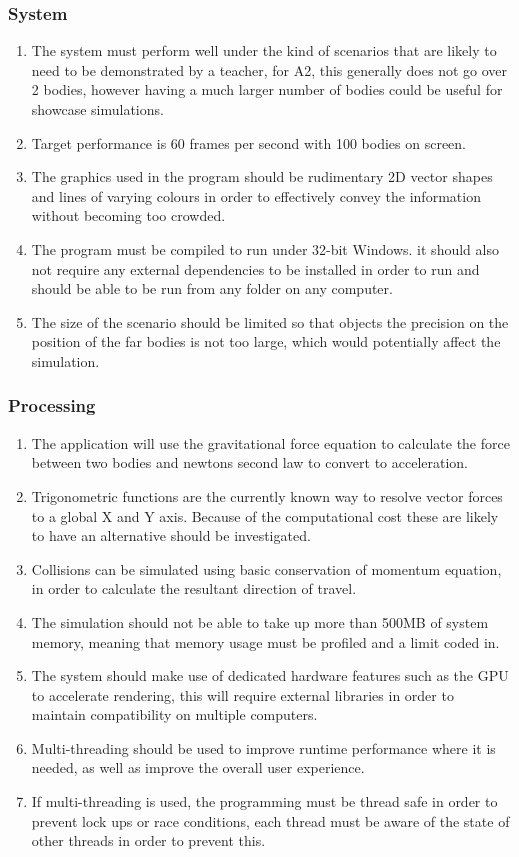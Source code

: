 \subsubsection{System}
\begin{enumerate}
\item The system must perform well under the kind of scenarios that are likely to need to be demonstrated by a teacher, for A2, this generally does not go over 2 bodies, however having a much larger number of bodies could be useful for showcase simulations.
\item Target performance is 60 frames per second with 100 bodies on screen.
\item The graphics used in the program should be rudimentary 2D vector shapes and lines of varying colours in order to effectively convey the information without becoming too crowded.
\item The program must be compiled to run under 32-bit Windows. it should also not require any external dependencies to be installed in order to run and should be able to be run from any folder on any computer.
\item The size of the scenario should be limited so that objects the precision on the position of the far bodies is not too large, which would potentially affect the simulation.
\end{enumerate}

\subsubsection{Processing}
\begin{enumerate}
\item The application will use the gravitational force equation to calculate the force between two bodies and newtons second law to convert to acceleration.
\item Trigonometric functions are the currently known way to resolve vector forces to a global X and Y axis. Because of the computational cost these are likely to have an alternative should be investigated.
\item Collisions can be simulated using basic conservation of momentum equation, in order to calculate the resultant direction of travel.
\item The simulation should not be able to take up more than 500MB of system memory, meaning that memory usage must be profiled and a limit coded in.
\item The system should make use of dedicated hardware features such as the GPU to accelerate rendering, this will require external libraries in order to maintain compatibility on multiple computers.
\item Multi-threading should be used to improve runtime performance where it is needed, as well as improve the overall user experience.
\item If multi-threading is used, the programming must be thread safe in order to prevent lock ups or race conditions, each thread must be aware of the state of other threads in order to prevent this.
\end{enumerate}

